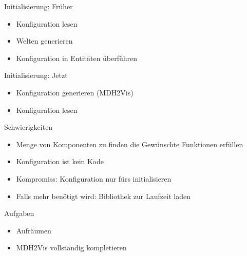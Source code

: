 \documentclass{../presentation}
\begin{document}
\begin{frame}{Initialisierung: Früher}
    \begin{itemize}
        \item Konfiguration lesen
        \item Welten generieren
        \item Konfiguration in Entitäten überführen
    \end{itemize}
\end{frame}

\begin{frame}{Initialisierung: Jetzt}
    \begin{itemize}
        \item Konfiguration generieren (MDH2Vis)
        \item Konfiguration lesen
    \end{itemize}
\end{frame}

\begin{frame}{Schwierigkeiten}
    \begin{itemize}
        \item Menge von Komponenten zu finden die Gewünschte Funktionen erfüllen
        \item Konfiguration ist kein Kode
        \item Kompromiss: Konfiguration nur fürs initialisieren
        \item Falls mehr benötigt wird: Bibliothek zur Laufzeit laden
    \end{itemize}
\end{frame}

\begin{frame}{Aufgaben}
    \begin{itemize}
        \item Aufräumen
        \item MDH2Vis vollständig kompletieren
    \end{itemize}
\end{frame}
\end{document}
